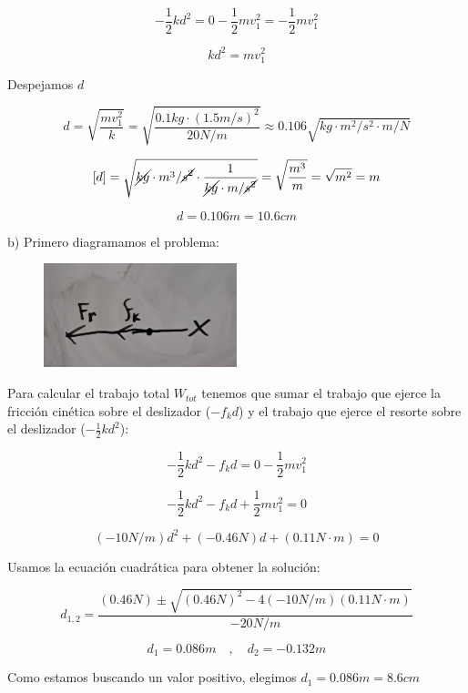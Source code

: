 \documentclass{article}
\begin{document}
    \[ -\frac{1}{2} k d^2 = 0 - \frac{1}{2} m v_1^2 = - \frac{1}{2} m v_1^2 \]

    \[ k d^2 = m v_1^2 \]

    \par Despejamos $d$

    \[ d = \sqrt{\frac{m v_1^2}{k}} = \sqrt{\frac{0.1 kg \cdot (1.5 m/s)^2}{20 N/m}} \approx 0.106 \sqrt{kg \cdot m^2/s^2 \cdot m/N}  \]

    \[ [d] = \sqrt{\cancel{kg} \cdot m^3/\cancel{s^2} \cdot \frac{1}{\cancel{kg} \cdot m/\cancel{s^2}}} = \sqrt{\frac{m^3}{m}} = \sqrt{m^2} = m \]

    \[ d = 0.106 m = 10.6 cm \]

    \par b) Primero diagramamos el problema:

    \begin{figure}[H]
        \centering
        \includegraphics[width=0.5\textwidth]{img/5.3-5.png}
    \end{figure}

    \par Para calcular el trabajo total $W_{tot}$ tenemos que sumar el trabajo que ejerce la fricción cinética sobre el deslizador ($ - f_k d $) y el trabajo que ejerce el resorte sobre el deslizador ($-\frac{1}{2} k d^2$):

    \[ -\frac{1}{2} k d^2 - f_k d = 0 - \frac{1}{2} m v_1^2 \]

    \[ -\frac{1}{2} k d^2 - f_k d + \frac{1}{2} m v_1^2 = 0 \]

    \[ (-10 N/m)d^2 + (-0.46 N)d + (0.11 N \cdot m) = 0 \]

    \par Usamos la ecuación cuadrática para obtener la solución:

    \[ d_{1,2} = \frac{(0.46 N) \pm \sqrt{ (0.46 N)^2 - 4 (-10 N/m) (0.11 N \cdot m)} }{-20 N/m} \]

    \[ d_1 =  0.086 m \quad , \quad d_2 = -0.132 m \]

    \par Como estamos buscando un valor positivo, elegimos $d_1 = 0.086 m = 8.6 cm$
\end{document}
